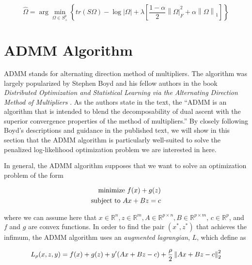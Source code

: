 \documentclass[11pt,]{report}
\theoremstyle{definition}
\theoremstyle{definition}
\theoremstyle{definition}
\theoremstyle{remark}
\begin{document}
\begin{equation}
\hat{\Omega} = \arg\min_{\Omega \in S_{+}^{p}}\left\{ tr\left(S\Omega\right) - \log\left|\Omega \right| + \lambda\left[\frac{1 - \alpha}{2}\left\| \Omega \right|_{F}^{2} + \alpha\left\| \Omega \right\|_{1} \right] \right\}
\label{eq:optimelastic}
\end{equation}

\hypertarget{admm-algorithm}{%
\section{ADMM Algorithm}\label{admm-algorithm}}

ADMM stands for alternating direction method of multipliers. The algorithm was largely popularized by Stephen Boyd and his fellow authors in the book \emph{Distributed Optimization and Statistical Learning via the Alternating Direction Method of Multipliers} \citep{boyd2011distributed}. As the authors state in the text, the ``ADMM is an algorithm that is intended to blend the decomposability of dual ascent with the superior convergence properties of the method of multipliers.'' By closely following Boyd's descriptions and guidance in the published text, we will show in this section that the ADMM algorithm is particularly well-suited to solve the penalized log-likelihood optimization problem we are interested in here.

In general, the ADMM algorithm supposes that we want to solve an optimization problem of the form

\begin{equation}
\begin{split}
  \mbox{minimize } f(x) + g(z) \\
  \mbox{subject to } Ax + Bz = c
\end{split}
\label{eq:boyd}\notag
\end{equation}

where we can assume here that \(x \in \mathbb{R}^{n}, z \in \mathbb{R}^{m}, A \in \mathbb{R}^{p \times n}, B \in \mathbb{R}^{p \times m}\), \(c \in \mathbb{R}^{p}\), and \(f\) and \(g\) are convex functions. In order to find the pair \((x^{*}, z^{*})\) that achieves the infimum, the ADMM algorithm uses an \emph{augmented lagrangian}, \(L\), which \citet{boyd2011distributed} define as

\begin{equation}
L_{\rho}(x, z, y) = f(x) + g(z) + y'(Ax + Bz - c) + \frac{\rho}{2}\left\| Ax + Bz - c \right\|_{2}^{2}
\label{eq:auglagrange}\notag
\end{equation}
\end{document}

